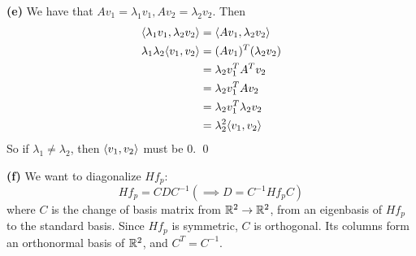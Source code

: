 \documentclass[a4paper, 12pt]{article}
\begin{document}
\begin{solution}
    \textbf{(e)} We have that $Av_1 = \lambda_1 v_1, Av_2 = \lambda_2 v_2$. Then \begin{align*}
        \langle \lambda_1 v_1, \lambda_2 v_2 \rangle & = \langle Av_1, \lambda_2 v_2 \rangle   \\
        \lambda_1 \lambda_2 \langle v_1, v_2 \rangle & =(Av_1)^T (\lambda_2 v_2)       \\
                                             & = \lambda_2 v_1^T A^T v_2       \\
                                             & = \lambda_2 v_1^T A v_2         \\
                                             & = \lambda_2 v_1^T \lambda_2 v_2 \\
                                             & = \lambda_2^2 \langle v_1, v_2 \rangle
    \end{align*}
    So if $\lambda_1 \neq \lambda_2$, then $\langle v_1, v_2 \rangle$ must be 0. \qed

    \textbf{(f)} We want to diagonalize $Hf_p$: \[
        Hf_p = CDC^{-1} (\implies D = C^{-1}Hf_p C)
    \]
    where $C$ is the change of basis matrix from $\mathbb{R}^2 \to \mathbb{R}^2$, from an eigenbasis of $Hf_p$ to the standard basis. Since $Hf_p$ is symmetric, $C$ is orthogonal. Its columns form an orthonormal basis of $\mathbb{R}^2$, and $C^T = C^{-1}$.


\end{solution}
\end{document}
